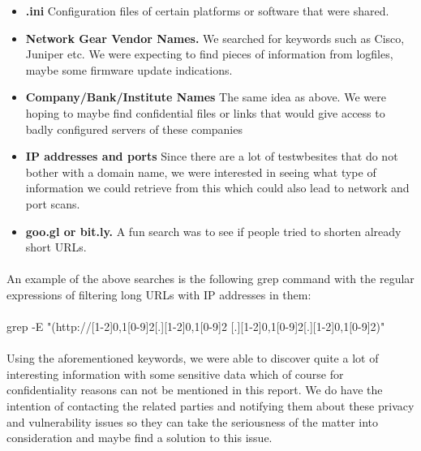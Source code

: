 \documentclass[12pt]{article}
\begin{document}
\begin{itemize}
\item \textbf{.ini} Configuration files of certain platforms or software that were shared.

\item \textbf{Network Gear Vendor Names.} We searched for keywords such as Cisco, Juniper etc. We were expecting to find pieces of information from logfiles, maybe some firmware update indications.

\item \textbf{Company/Bank/Institute Names} The same idea as above. We were hoping to maybe find confidential files or links that would give access to badly configured servers of these companies

\item \textbf{IP addresses and ports} Since there are a lot of testwbesites that do not bother with a domain name, we were interested in seeing what type of information we could retrieve from this which could also lead to network and port scans.

\item \textbf{goo.gl or bit.ly.} A fun search was to see if people tried to shorten already short URLs.

\end{itemize}

\paragraph{}
An example of the above searches is the following grep command with the regular expressions of filtering long URLs with IP addresses in them:

\paragraph{}
grep -E "(http://[1-2]{0,1}[0-9]{2}[.][1-2]{0,1}[0-9]{2}
[.][1-2]{0,1}[0-9]{2}[.][1-2]{0,1}[0-9]{2})"

\paragraph{}
Using the aforementioned keywords, we were able to discover quite a lot of interesting information with some sensitive data which of course for confidentiality reasons can not be mentioned in this report. We do have the intention of contacting the related parties and notifying them about these privacy and vulnerability issues so they can take the seriousness of the matter into consideration and maybe find a solution to this issue.
\newpage
\end{document}
